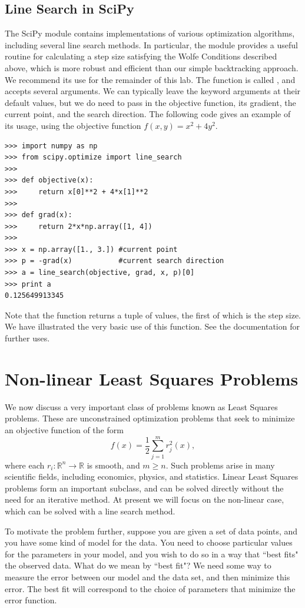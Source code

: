 \subsection*{Line Search in SciPy}
The SciPy module  contains implementations of various optimization algorithms,
including several line search methods. In particular, the module provides a useful routine for
calculating a step size satisfying the Wolfe Conditions described above, which is more robust
and efficient than our simple backtracking approach. We recommend its use for the remainder of
this lab. The function is called , and accepts several arguments. We can typically
leave the keyword arguments at their default values, but we do need to pass in the objective
function, its gradient, the current point, and the search direction. The following code gives
an example of its usage, using the objective function $f(x, y) = x^2+4y^2$.
\begin{lstlisting}
>>> import numpy as np
>>> from scipy.optimize import line_search
>>>
>>> def objective(x):
>>>     return x[0]**2 + 4*x[1]**2
>>>
>>> def grad(x):
>>>     return 2*x*np.array([1, 4])
>>>
>>> x = np.array([1., 3.]) #current point
>>> p = -grad(x)           #current search direction
>>> a = line_search(objective, grad, x, p)[0]
>>> print a
0.125649913345
\end{lstlisting}
Note that the function returns a tuple of values, the first of which is the step size. We have illustrated
the very basic use of this function. See the documentation for further uses.

\section*{Non-linear Least Squares Problems}
We now discuss a very important class of problems known as Least Squares problems. These
are unconstrained optimization problems that seek to minimize an objective function of the form
$$
f(x) = \frac{1}{2}\displaystyle\sum_{j=1}^m r_j^2(x),
$$
where each $r_i : \mathbb{R}^n \rightarrow \mathbb{R}$ is smooth, and $m \geq n$. Such problems
arise in many scientific fields, including economics, physics, and statistics. Linear Least
Squares problems form an important subclass, and can be solved directly without the need for an
iterative method. At present we will focus on the non-linear case, which can be solved with a
line search method.

To motivate the problem further, suppose you are given a set of data points, and you have some kind of model for the data.
You need to choose particular values for the parameters in your model, and you wish to do so in a way that ``best fits"
the observed data. What do we mean by ``best fit"? We need some way to measure the error between our model and the data set,
and then minimize this error. The best fit will correspond to the choice of parameters that minimize the error function.

